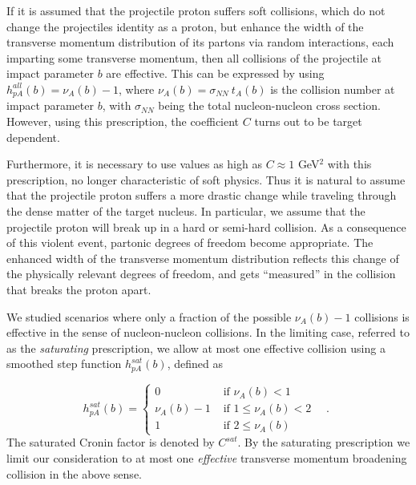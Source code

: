 If it is assumed that the projectile proton suffers soft collisions, 
which do not change the projectiles identity as a proton, but
enhance the width of the transverse momentum distribution of its
partons via random interactions, each imparting some transverse 
momentum, then all collisions of the projectile 
at impact parameter $b$ are effective. This can be expressed by
using $h^{all}_{pA}(b)=\nu_A(b) - 1$,
where $\nu_A(b) = \sigma_{NN} \ t_A(b)$ 
is the collision number at impact parameter $b$, with $\sigma_{NN}$
being the total nucleon-nucleon cross section. 
However, using this prescription,
the coefficient $C$ turns out to be target dependent\cite{plf00}. 

Furthermore, it is necessary to use values as high as $C \approx 1$ GeV$^2$
with this prescription, no longer characteristic of soft 
physics. Thus it is natural to assume that the projectile proton 
suffers a more drastic change while traveling through the dense 
matter of the target nucleus. In particular, we assume that the 
projectile proton will break up in
a hard or semi-hard collision. As a consequence of this violent 
event, partonic degrees of freedom become appropriate.
The enhanced width of the transverse momentum distribution reflects this
change of the physically relevant degrees of freedom, and gets
``measured'' in the collision that breaks the proton apart.  

We studied scenarios where
only a fraction of the possible $\nu_A(b)-1$ collisions is effective
in the sense of nucleon-nucleon collisions. In the limiting case,
referred to as the {\it saturating} prescription, we 
allow at most one effective collision using a 
smoothed step function $h^{sat}_{pA}(b)$, defined as

\begin{equation}
\label{hsat}
 h^{sat}_{pA}(b)  = \left\{ \begin{array}{ll}
           0  & \mbox{ if \ $\nu_A(b) < 1$ } \\
  \nu_A(b)-1  & \mbox{ if \ $1 \leq \nu_A(b) < 2$ } \ \ \ . \\
           1  & \mbox{ if \ $2 \leq \nu_A(b)$  } 
           \end{array} \right. 
\end{equation}
The saturated Cronin factor is denoted by  $ C^{sat}$. 
By the saturating prescription we limit 
our consideration to at most one {\it effective}
transverse momentum broadening collision in the above sense.

